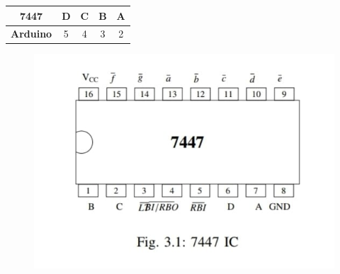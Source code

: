 \documentclass[journal]{IEEEtran}
\begin{document}
\begin{table}[h]
    \centering
    \begin{tabular}{|c|c|c|c|c|}
        \hline
        \textbf{7447} & D & C & B & A \\ \hline
        \textbf{Arduino} & 5 & 4 & 3 & 2 \\ \hline
    \end{tabular}
\end{table}

\begin{figure}[h]
    \centering
    \begin{minipage}{0.48\textwidth}
        \centering
        \includegraphics[width=\textwidth]{figs/7447.jpeg} 
    \end{minipage}
    \hfill
    \begin{minipage}{0.48\textwidth}
        \centering

\end{minipage}
\end{figure}
\end{document}
